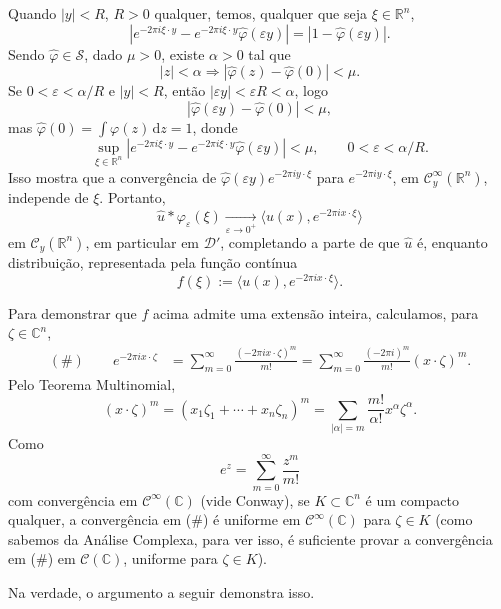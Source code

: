 \documentclass[../distribution_theory_notes.tex]{subfiles}
\begin{document}
\begin{proof*}
	Quando \(|y|<R\), \(R>0\) qualquer, temos, qualquer que seja \(\xi\in\mathbb{R}^n\),
	\[
		\left|e^{-2\pi i\xi\cdot y}-e^{-2\pi i\xi\cdot y}\hat\varphi(\varepsilon y)\right|
		=|1-\hat\varphi(\varepsilon y)|.
	\]
	Sendo \(\hat\varphi\in\mathcal{S}\), dado \(\mu>0\), existe \(\alpha>0\) tal que
	\[
		|z|<\alpha\Longrightarrow |\hat\varphi(z)-\hat\varphi(0)|<\mu.
	\]
	Se \(0<\varepsilon<\alpha/R\) e \(|y|<R\), então \(|\varepsilon y|<\varepsilon R<\alpha\), logo
	\[
		|\hat\varphi(\varepsilon y)-\hat\varphi(0)|<\mu,
	\]
	mas \(\hat\varphi(0)=\int\varphi(z)\,\mathrm{d}z=1\), donde
	\[
		\sup_{\xi\in\mathbb{R}^n}
		\left|e^{-2\pi i\xi\cdot y}-e^{-2\pi i\xi\cdot y}\hat\varphi(\varepsilon y)\right|<\mu,
		\qquad 0<\varepsilon<\alpha/R.
	\]
	Isso mostra que a convergência de \(\hat\varphi(\varepsilon y)e^{-2\pi i y\cdot\xi}\) para \(e^{-2\pi i y\cdot\xi}\), em \(\mathcal{C}_y^\infty(\mathbb{R}^n)\), independe de \(\xi\). Portanto,
	\[
		\hat u*\varphi_\varepsilon(\xi)
		\underset{\varepsilon\to0^+}{\longrightarrow}
		\langle u(x),e^{-2\pi i x\cdot\xi}\rangle
	\]
	em \(\mathcal{C}_y(\mathbb{R}^n)\), em particular em \(\mathcal{D}'\), completando a parte de que \(\hat u\) é, enquanto distribuição, representada pela função contínua
	\[
		f(\xi):=\langle u(x),e^{-2\pi i x\cdot\xi}\rangle.
	\]

	Para demonstrar que \(f\) acima admite uma extensão inteira, calculamos, para \(\zeta\in\mathbb{C}^n\),
	\begin{align*}
		(\#)\qquad e^{-2\pi i x\cdot\zeta}
		 & =\sum_{m=0}^\infty\frac{(-2\pi i x\cdot\zeta)^m}{m!}
		=\sum_{m=0}^\infty\frac{(-2\pi i)^m}{m!}(x\cdot\zeta)^m.
	\end{align*}
	Pelo Teorema Multinomial,
	\[
		(x\cdot\zeta)^m
		=(x_1\zeta_1+\cdots+x_n\zeta_n)^m
		=\sum_{|\alpha|=m}\frac{m!}{\alpha!}x^\alpha\zeta^\alpha.
	\]
	Como
	\[
		e^z=\sum_{m=0}^\infty\frac{z^m}{m!}
	\]
	com convergência em \(\mathcal{C}^\infty(\mathbb{C})\) (vide Conway), se \(K\subset\mathbb{C}^n\) é um compacto qualquer, a convergência em (\#) é uniforme em \(\mathcal{C}^\infty(\mathbb{C})\) para \(\zeta\in K\) (como sabemos da Análise Complexa, para ver isso, é suficiente provar a convergência em (\#) em \(\mathcal{C}(\mathbb{C})\), uniforme para \(\zeta\in K\)).

	\begin{tcolorbox}[
			skin=enhanced,
			title=Observação,
			fonttitle=\bfseries,
			colframe=black,
			colbacktitle=cyan!75!white,
			colback=cyan!15,
			colbacklower=black,
			coltitle=black,
			drop fuzzy shadow
		]
		Na verdade, o argumento a seguir demonstra isso.
	\end{tcolorbox}


\end{proof*}
\end{document}
